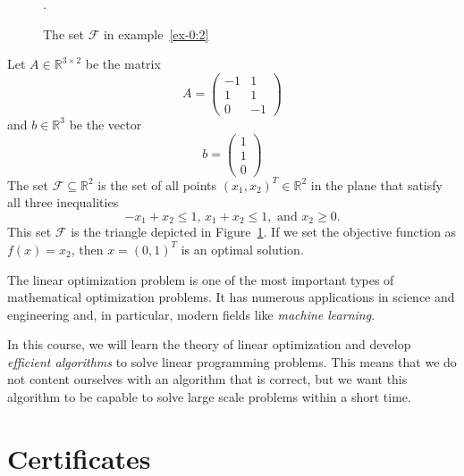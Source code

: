 \begin{example}
  \label{ex-0:2}
    \begin{figure}
      \centering
        
      \caption{The set $ℱ$ in example~\ref{ex-0:2}}. 
      \label{fig:10}
    \end{figure}

  Let $A ∈ ℝ^{3 ×2}$ be the matrix
  \begin{displaymath}
    A =
    \begin{pmatrix}
      -1 & 1 \\
      1 & 1 \\
      0 & -1 
    \end{pmatrix}
  \end{displaymath}
  and $b ∈ ℝ^3$ be the vector
  \begin{displaymath}
    b =
    \begin{pmatrix}
      1 \\ 1 \\ 0
    \end{pmatrix}
  \end{displaymath}
  The set $ℱ ⊆ ℝ^2$ is the set of all points $(x_1,x_2)^T ∈ ℝ^2$ in the plane that satisfy all three inequalities
  \begin{displaymath}
    -x_1+ x_2 ≤1, \,  x_1+ x_2 ≤1, \text{ and } x_2 ≥0. 
  \end{displaymath} This set $ℱ$ is the triangle depicted in Figure~\ref{fig:10}. 
  If we set the objective function as $f(x) = x_2$, then $x = (0,1)^T$ is an optimal solution.   
\end{example}
The linear optimization problem is one of the most important types of mathematical optimization problems. It has numerous applications in science and engineering and, in particular, modern fields like \emph{machine learning}.

In this course, we will learn  the theory of linear optimization and develop \emph{efficient algorithms} to solve linear programming problems. This means that we do not content ourselves with an algorithm that is correct, but we want this algorithm to be capable to solve large scale problems within a short time. 




\section{Certificates}
\label{sec:certificates}


